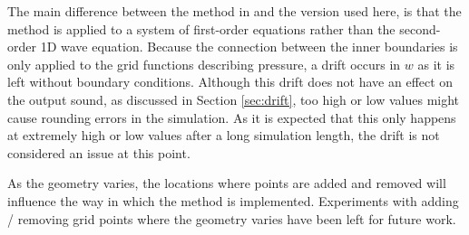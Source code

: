 The main difference between the method in \cite{Willemsen2021} and the version used here, is that the method is applied to a system of first-order equations rather than the second-order 1D wave equation. Because the connection between the inner boundaries is only applied to the grid functions describing pressure, a drift occurs in $w$ as it is left without boundary conditions. Although this drift does not have an effect on the output sound, as discussed in Section \ref{sec:drift}, too high or low values might cause rounding errors in the simulation. As it is expected that this only happens at extremely high or low values after a long simulation length, the drift is not considered an issue at this point. 


As the geometry varies, the locations where points are added and removed will influence the way in which the method is implemented. %
Experiments with adding / removing grid points where the geometry varies have been left for future work. 

